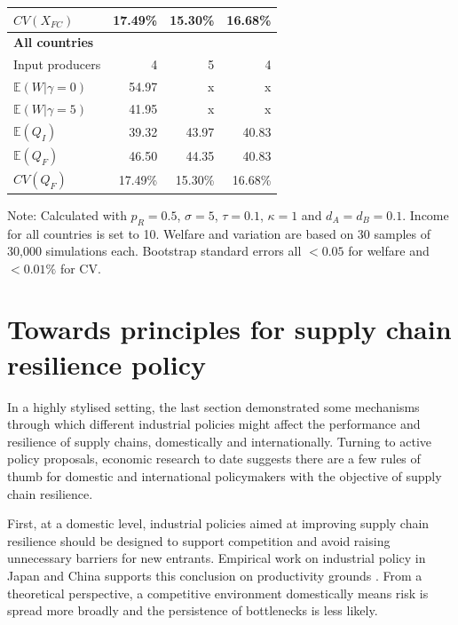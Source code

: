 \documentclass{article}
\begin{document}
\begin{table}
\begin{threeparttable}
\begin{tabular}{lrrr}
            $CV(X_{FC})$ & 17.49\% & 15.30\% & 16.68\% \\
            \midrule
            \textbf{All countries} \\
            Input producers & 4 & 5 & 4 \\
            $\mathbb{E}(W | \gamma = 0)$ & 54.97 & x & x \\
            $\mathbb{E}(W | \gamma = 5)$ & 41.95 & x & x \\
            $\mathbb{E}(Q_I)$ & 39.32 & 43.97 & 40.83 \\
            $\mathbb{E}(Q_F)$ & 46.50 & 44.35 & 40.83 \\
            $CV(Q_F)$ & 17.49\% & 15.30\% & 16.68\% \\
            \bottomrule
        \end{tabular}
        \begin{tablenotes}
            \small \item Note: Calculated with $p_R = 0.5$, $\sigma = 5$, $\tau = 0.1$, $\kappa = 1$ and $d_A = d_B = 0.1$. Income for all countries is set to 10. Welfare and variation are based on 30 samples of 30,000 simulations each. Bootstrap standard errors all $<0.05$ for welfare and $<0.01\%$ for CV.
        \end{tablenotes}
    \end{threeparttable}
\end{table}

\section{Towards principles for supply chain resilience policy}

In a highly stylised setting, the last section demonstrated some mechanisms through which different industrial policies might affect the performance and resilience of supply chains, domestically and internationally. Turning to active policy proposals, economic research to date suggests there are a few rules of thumb for domestic and international policymakers with the objective of supply chain resilience.

First, at a domestic level, industrial policies aimed at improving supply chain resilience should be designed to support competition and avoid raising unnecessary barriers for new entrants. Empirical work on industrial policy in Japan and China supports this conclusion on productivity grounds \parencite{porter_competition_2004, aghion_industrial_2015}. From a theoretical perspective, a competitive environment domestically means risk is spread more broadly and the persistence of bottlenecks is less likely.
\end{document}
